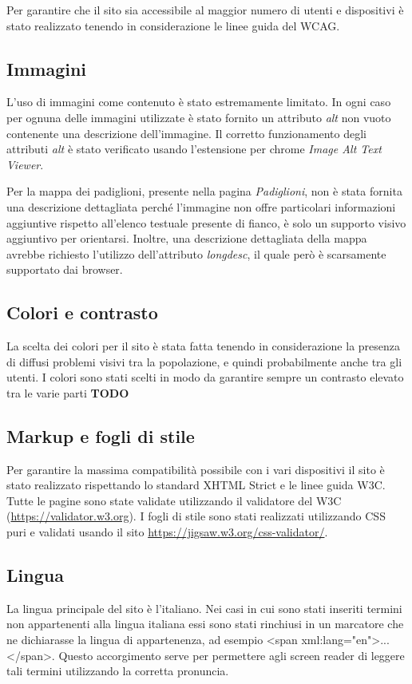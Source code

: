 Per garantire che il sito sia accessibile al maggior numero di utenti e dispositivi è stato realizzato tenendo in considerazione le linee guida del WCAG. \newline

\subsection{Immagini}
L'uso di immagini come contenuto è stato estremamente limitato. In ogni caso per ognuna delle immagini utilizzate è stato fornito un attributo \textit{alt} non vuoto contenente una descrizione dell'immagine. Il corretto funzionamento degli attributi \textit{alt} è stato verificato usando l'estensione per chrome \textit{Image Alt Text Viewer}.

Per la mappa dei padiglioni, presente nella pagina \textit{Padiglioni}, non è stata fornita una descrizione dettagliata perché l'immagine non offre particolari informazioni aggiuntive rispetto all'elenco testuale presente di fianco, è solo un supporto visivo aggiuntivo per orientarsi. Inoltre, una descrizione dettagliata della mappa avrebbe richiesto l'utilizzo dell'attributo \textit{longdesc}, il quale però è scarsamente supportato dai browser.

\subsection{Colori e contrasto}
La scelta dei colori per il sito è stata fatta tenendo in considerazione la presenza di diffusi problemi visivi tra la popolazione, e quindi probabilmente anche tra gli utenti. I colori sono stati scelti in modo da garantire sempre un contrasto elevato tra le varie parti \textbf{TODO}

\subsection{Markup e fogli di stile}
Per garantire la massima compatibilità possibile con i vari dispositivi il sito è stato realizzato rispettando lo standard XHTML Strict e le linee guida W3C. Tutte le pagine sono state validate utilizzando il validatore del W3C (\url{https://validator.w3.org}). \newline
I fogli di stile sono stati realizzati utilizzando CSS puri e validati usando il sito \url{https://jigsaw.w3.org/css-validator/}.

\subsection{Lingua}
La lingua principale del sito è l'italiano. Nei casi in cui sono stati inseriti termini non appartenenti alla lingua italiana essi sono stati rinchiusi in un marcatore che ne dichiarasse la lingua di appartenenza, ad esempio <span xml:lang="en">...</span>. Questo accorgimento serve per permettere agli screen reader di leggere tali termini utilizzando la corretta pronuncia.

